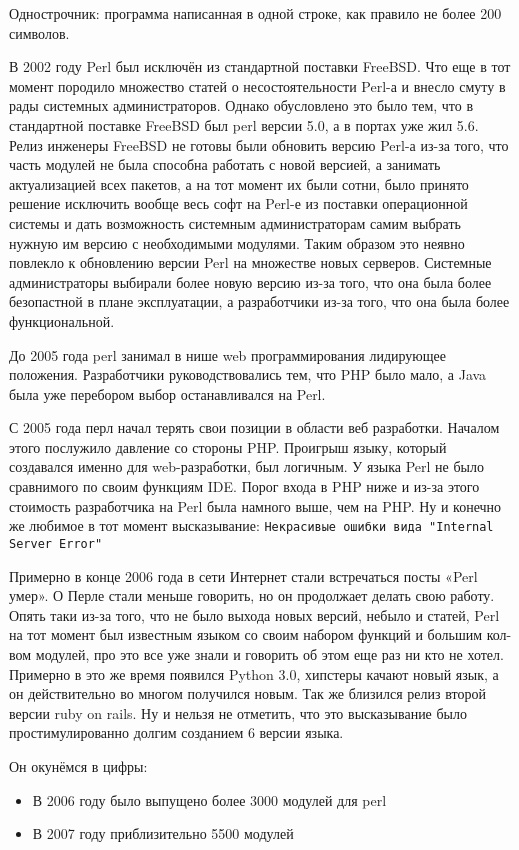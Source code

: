 Однострочник: программа написанная в одной строке, как правило не более 200 символов.

В 2002 году Perl был исключён из стандартной поставки FreeBSD. Что еще в тот момент породило множество статей  о несостоятельности Perl-а и внесло смуту в рады системных администраторов. Однако обусловлено это было тем, что в стандартной поставке FreeBSD был perl версии 5.0, а в портах уже жил 5.6. Релиз инженеры FreeBSD не готовы были обновить версию Perl-а из-за того, что часть модулей не была способна работать с новой версией, а занимать актуализацией всех пакетов, а на тот момент их были сотни, было принято решение исключить вообще весь софт на Perl-е из поставки операционной системы и дать возможность системным администраторам самим выбрать нужную им версию с необходимыми модулями. Таким образом это неявно повлекло к обновлению версии Perl на множестве новых серверов. Системные администраторы выбирали более новую версию из-за того, что она была более безопастной в плане эксплуатации, а разработчики из-за того, что она была более функциональной.

До 2005 года perl занимал в нише web программирования лидирующее положения. Разработчики руководствовались тем, что PHP было мало, а Java была уже перебором выбор останавливался на Perl.

С 2005 года перл начал терять свои позиции в области веб разработки. Началом этого послужило давление со стороны PHP. Проигрыш языку, который создавался именно для web-разработки, был логичным. У языка Perl не было сравнимого по своим функциям IDE. Порог входа в PHP ниже и из-за этого стоимость разработчика на Perl была намного выше, чем на PHP. Ну и конечно же любимое в тот момент высказывание: \verb|Некрасивые ошибки вида "Internal Server Error"|

Примерно в конце 2006 года в сети Интернет стали встречаться посты «Perl умер». О Перле стали меньше говорить, но он продолжает делать свою работу. Опять таки из-за того, что не было выхода новых версий, небыло и статей, Perl на тот момент был известным языком со своим набором функций и большим кол-вом модулей, про это все уже знали и говорить об этом еще раз ни кто не хотел. Примерно в это же время появился Python 3.0, хипстеры качают новый язык, а он действительно во многом получился новым. Так же близился релиз второй версии ruby on rails. Ну и нельзя не отметить, что это высказывание было простимулированно долгим созданием 6 версии языка.

Он окунёмся в цифры:
\begin{itemize}
 \item В 2006 году было выпущено более 3000 модулей для perl
 \item В 2007 году приблизительно 5500 модулей
\end{itemize}

